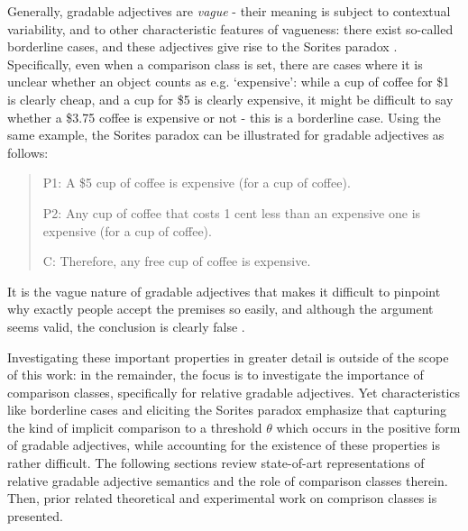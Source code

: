 Generally, gradable adjectives are \textit{vague} - their meaning is subject to contextual variability, and to other characteristic features of vagueness: there exist so-called borderline cases, and these adjectives give rise to the Sorites paradox \parencite{Kennedy2007}. Specifically, even when a comparison class is set, there are cases where it is unclear whether an object counts as e.g. ‘expensive’: while a cup of coffee for \$1 is clearly cheap, and a cup for \$5 is clearly expensive, it might be difficult to say whether a  \$3.75 coffee is expensive or not - this is a borderline case. Using the same example, the Sorites paradox can be illustrated for gradable adjectives as follows: 
\begin{quotation}
P1: A \$5 cup of coffee is expensive (for a cup of coffee). 

P2: Any cup of coffee that costs 1 cent less than an expensive one is expensive (for a cup of coffee). 

C: Therefore, any free cup of coffee is expensive. 
\end{quotation}

It is the vague nature of gradable adjectives that makes it difficult to pinpoint why exactly people accept the premises so easily, and although the argument seems valid, the conclusion is clearly false \parencite[see][for more details]{Kennedy2007}.

Investigating these important properties in greater detail is outside of the scope of this work: in the remainder, the focus is to investigate the importance of comparison classes, specifically for relative gradable adjectives. Yet characteristics like borderline cases and eliciting the Sorites paradox emphasize that capturing the kind of implicit comparison to a threshold $\theta$ which occurs in the positive form of gradable adjectives, while accounting for the existence of these properties is rather difficult. 
The following sections review state-of-art representations of relative gradable adjective semantics and the role of comparison classes therein. Then, prior related theoretical and experimental work on comprison classes is presented. 

